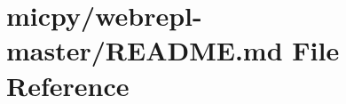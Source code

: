 \hypertarget{micpy_2webrepl-master_2README_8md}{\section{micpy/webrepl-\/master/\-R\-E\-A\-D\-M\-E.md File Reference}
\label{micpy_2webrepl-master_2README_8md}
}
